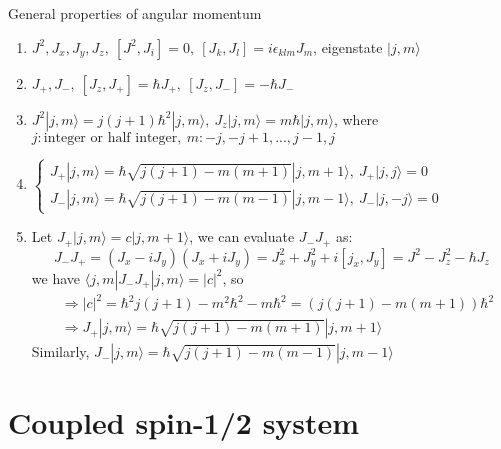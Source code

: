 \documentclass[UTF8,12pt]{article} %
\makeatletter
\newenvironment{proof}[1][\protect\proofname]{\par
\normalfont\topsep6\p@\@plus6\p@\relax
\trivlist
\itemindent\parindent
\item[\hskip\labelsep
\scshape
#1]\ignorespaces
}{%
\endtrivlist\@endpefalse
}
\renewcommand{\proofname}{\it{Solution}}
\makeatother
\begin{document}
\begin{myboxes}{General properties of angular momentum}{}
\begin{enumerate}
\item $J^{2}, J_{x}, J_{y}, J_{z},~ [J^{2},J_{i}] = 0,~ [J_{k},J_{l}] = i\epsilon_{klm}J_{m}$, eigenstate $|j,m\rangle$
\item $J_{+},J_{-},~ [J_{z},J_{+}] = \hbar J_{+},~ [J_{z},J_{-}] = -\hbar J_{-}$
\item $J^{2}|j,m\rangle = j(j+1)\hbar^{2}|j,m\rangle,~J_{z}|j,m\rangle = m\hbar|j,m\rangle$, where\\ $j: \text{integer or half integer},~ m: -j,-j+1,...,j-1,j$
\item $\begin{cases}J_{+}|j,m\rangle = \hbar\sqrt{j(j+1)-m(m+1)}|j,m+1\rangle,~ J_{+}|j,j\rangle = 0 \\ J_{-}|j,m\rangle = \hbar\sqrt{j(j+1)-m(m-1)}|j,m-1\rangle,~J_{-}|j,-j\rangle = 0\end{cases}$
\begin{proof}[Proof]
Let $J_{+}|j,m\rangle = c|j,m+1\rangle$, we can evaluate $J_{-}J_{+}$ as:
$$J_{-}J_{+} = (J_{x}-iJ_{y})(J_{x}+iJ_{y}) = J_{x}^{2} + J_{y}^{2} + i[j_{x},J_{y}] = J^{2} - J_{z}^{2} - \hbar J_{z}$$
we have $\langle j,m|J_{-}J_{+}|j,m\rangle = \left|c\right|^{2}$, so
\begin{align*}
&\Rightarrow |c|^{2} = \hbar^{2}j(j+1) - m^{2}\hbar^{2} - m\hbar^{2} = \left(j(j+1)-m(m+1)\right)\hbar^{2}\\
&\Rightarrow J_{+}|j,m\rangle = \hbar\sqrt{j(j+1)-m(m+1)}|j,m+1\rangle
\end{align*}
Similarly, $J_{-}|j,m\rangle = \hbar\sqrt{j(j+1)-m(m-1)}|j,m-1\rangle$
\end{proof}
\end{enumerate}
\end{myboxes}

\section{Coupled spin-1/2 system}
\end{document}

